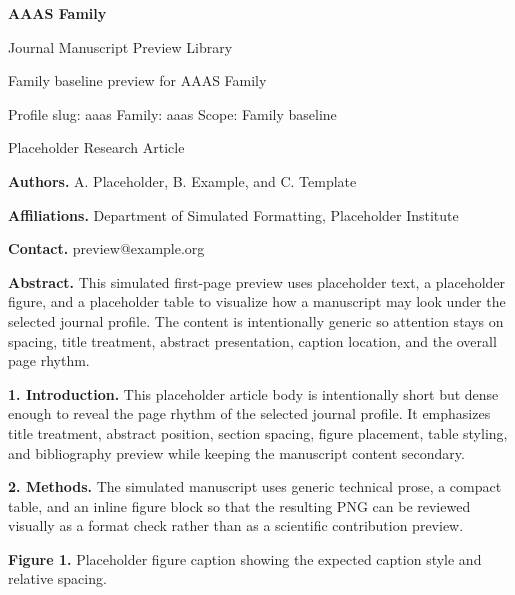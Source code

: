 \documentclass[10pt,a4paper]{article}
\begin{document}
\begin{flushleft}
{\huge\bfseries AAAS Family}\par
\vspace{0.25em}
{\small Journal Manuscript Preview Library}\par
\vspace{0.15em}
{\footnotesize Family baseline preview for AAAS Family}\par
\vspace{0.2em}
{\footnotesize Profile slug: aaas \quad Family: aaas \quad Scope: Family baseline}
\end{flushleft}
\vspace{0.2em}
 Placeholder Research Article\par\vspace{0.4em}


\noindent\textbf{Authors.} A. Placeholder, B. Example, and C. Template\par
\noindent\textbf{Affiliations.} Department of Simulated Formatting, Placeholder Institute\par
\noindent\textbf{Contact.} preview@example.org\par
\vspace{0.4em}
\noindent\textbf{Abstract.} This simulated first-page preview uses placeholder text, a placeholder figure, and a placeholder table to visualize how a manuscript may look under the selected journal profile. The content is intentionally generic so attention stays on spacing, title treatment, abstract presentation, caption location, and the overall page rhythm.\par\vspace{0.6em}



\small
\textbf{1. Introduction.} This placeholder article body is intentionally short but dense enough to reveal the page rhythm of the selected journal profile. It emphasizes title treatment, abstract position, section spacing, figure placement, table styling, and bibliography preview while keeping the manuscript content secondary.

\textbf{2. Methods.} The simulated manuscript uses generic technical prose, a compact table, and an inline figure block so that the resulting PNG can be reviewed visually as a format check rather than as a scientific contribution preview.


\begin{center}\end{center}\noindent\textbf{Figure 1.} Placeholder figure caption showing the expected caption style and relative spacing.\par\vspace{0.5em}
\end{document}
